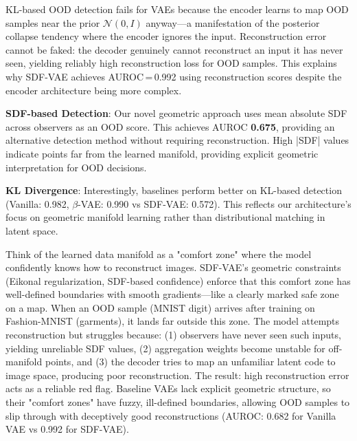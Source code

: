 \documentclass[10pt,twocolumn,letterpaper]{article}
\begin{document}
\begin{intuitionbox}
KL-based OOD detection fails for VAEs because the encoder learns to map OOD samples near the prior $\mathcal{N}(0, I)$ anyway---a manifestation of the posterior collapse tendency where the encoder ignores the input. Reconstruction error cannot be faked: the decoder genuinely cannot reconstruct an input it has never seen, yielding reliably high reconstruction loss for OOD samples. This explains why SDF-VAE achieves AUROC\,=\,0.992 using reconstruction scores despite the encoder architecture being more complex.
\end{intuitionbox}

\textbf{SDF-based Detection}: Our novel geometric approach uses mean absolute SDF across observers as an OOD score. This achieves AUROC \textbf{0.675}, providing an alternative detection method without requiring reconstruction. High |SDF| values indicate points far from the learned manifold, providing explicit geometric interpretation for OOD decisions.

\textbf{KL Divergence}: Interestingly, baselines perform better on KL-based detection (Vanilla: 0.982, $\beta$-VAE: 0.990 vs SDF-VAE: 0.572). This reflects our architecture's focus on geometric manifold learning rather than distributional matching in latent space.

\begin{intuitionbox}
Think of the learned data manifold as a "comfort zone" where the model confidently knows how to reconstruct images. SDF-VAE's geometric constraints (Eikonal regularization, SDF-based confidence) enforce that this comfort zone has well-defined boundaries with smooth gradients---like a clearly marked safe zone on a map. When an OOD sample (MNIST digit) arrives after training on Fashion-MNIST (garments), it lands far outside this zone. The model attempts reconstruction but struggles because: (1) observers have never seen such inputs, yielding unreliable SDF values, (2) aggregation weights become unstable for off-manifold points, and (3) the decoder tries to map an unfamiliar latent code to image space, producing poor reconstruction. The result: high reconstruction error acts as a reliable red flag. Baseline VAEs lack explicit geometric structure, so their "comfort zones" have fuzzy, ill-defined boundaries, allowing OOD samples to slip through with deceptively good reconstructions (AUROC: 0.682 for Vanilla VAE vs 0.992 for SDF-VAE).
\end{intuitionbox}
\end{document}
